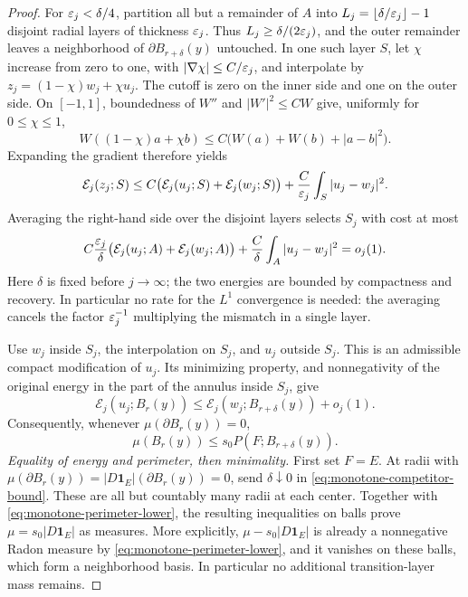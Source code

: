 \begin{proof}
For $\varepsilon_j<\delta/4$, partition all but a remainder of $A$ into
$L_j=\lfloor\delta/\varepsilon_j\rfloor-1$ disjoint radial layers of
thickness $\varepsilon_j$.  Thus $L_j\ge\delta/(2\varepsilon_j)$, and the
outer remainder leaves a neighborhood of $\partial B_{r+\delta}(y)$
untouched.  In one such layer $S$, let $\chi$ increase from
zero to one, with $|\nabla\chi|\le C/\varepsilon_j$, and interpolate by
$z_j=(1-\chi)w_j+\chi u_j$.  The cutoff is zero on the inner side
and one on the outer side.  On $[-1,1]$, boundedness of $W''$ and
$|W'|^2\le CW$ give, uniformly for $0\le\chi\le1$,
\[
 W((1-\chi)a+\chi b)
       \le C\bigl(W(a)+W(b)+|a-b|^2\bigr).
\]
Expanding the gradient therefore yields
\begin{equation}
 \mathcal E_j(z_j;S)
 \le C\bigl(\mathcal E_j(u_j;S)+\mathcal E_j(w_j;S)\bigr)
             +\frac C{\varepsilon_j}\int_S|u_j-w_j|^2.
 \label{eq:monotone-strip-cost}
\end{equation}
Averaging the right-hand side over the disjoint layers selects $S_j$
with cost at most
\begin{equation}
 C\frac{\varepsilon_j}{\delta}
     \bigl(\mathcal E_j(u_j;A)+\mathcal E_j(w_j;A)\bigr)
       +\frac C\delta\int_A|u_j-w_j|^2=o_j(1).
 \label{eq:monotone-strip-average}
\end{equation}
Here $\delta$ is fixed before $j\to\infty$; the two energies are
bounded by compactness and recovery.  In particular no rate for the
$L^1$ convergence is needed: the averaging cancels the factor
$\varepsilon_j^{-1}$ multiplying the mismatch in a single layer.

Use $w_j$ inside $S_j$, the interpolation on $S_j$, and $u_j$
outside $S_j$.  This is an admissible compact modification of $u_j$.
Its minimizing property, and nonnegativity of the original energy in
the part of the annulus inside $S_j$, give
\[
 \mathcal E_j(u_j;B_r(y))
   \le \mathcal E_j(w_j;B_{r+\delta}(y))+o_j(1).
\]
Consequently, whenever $\mu(\partial B_r(y))=0$,
\begin{equation}
 \mu(B_r(y))\le s_0 P(F;B_{r+\delta}(y)).
 \label{eq:monotone-competitor-bound}
\end{equation}
\emph{Equality of energy and perimeter, then minimality.}
First set $F=E$.  At radii with
$\mu(\partial B_r(y))=|D\mathbf1_E|(\partial B_r(y))=0$, send
$\delta\downarrow0$ in \eqref{eq:monotone-competitor-bound}.  These
are all but countably many radii at each center.  Together with
\eqref{eq:monotone-perimeter-lower}, the resulting inequalities on
balls prove $\mu=s_0|D\mathbf1_E|$ as measures.  More explicitly,
$\mu-s_0|D\mathbf1_E|$ is already a nonnegative Radon measure by
\eqref{eq:monotone-perimeter-lower}, and it vanishes on these balls,
which form a neighborhood basis.  In particular no additional
transition-layer mass remains.


\end{proof}
